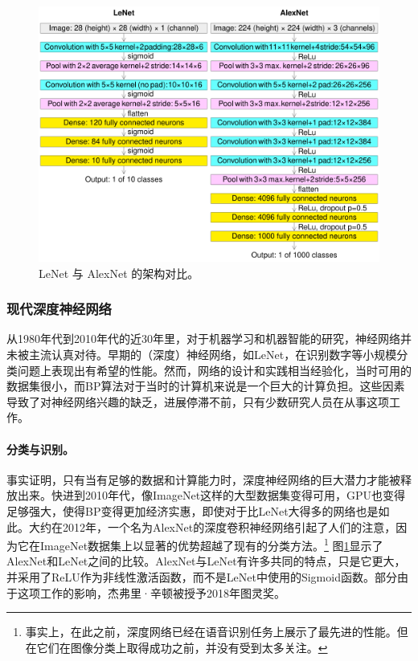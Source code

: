 \documentclass[../../book-main.tex]{subfiles}
\begin{document}
\begin{figure}
    \centering
    \includegraphics[width=0.8\linewidth]{figures/Comparison_image_neural_networks.svg.png}
    \caption{LeNet \cite{LeCun-1989} 与 AlexNet \cite{krizhevsky2012imagenet} 的架构对比。}
    \label{fig:LeNet-AlexNet}
\end{figure}


\subsubsection{现代深度神经网络}
从1980年代到2010年代的近30年里，对于机器学习和机器智能的研究，神经网络并未被主流认真对待。早期的（深度）神经网络，如LeNet，在识别数字等小规模分类问题上表现出有希望的性能。然而，网络的设计和实践相当经验化，当时可用的数据集很小，而BP算法对于当时的计算机来说是一个巨大的计算负担。这些因素导致了对神经网络兴趣的缺乏，进展停滞不前，只有少数研究人员在从事这项工作。

\paragraph{分类与识别。}
事实证明，只有当有足够的数据和计算能力时，深度神经网络的巨大潜力才能被释放出来。快进到2010年代，像ImageNet这样的大型数据集变得可用，GPU也变得足够强大，使得BP变得更加经济实惠，即使对于比LeNet大得多的网络也是如此。大约在2012年，一个名为AlexNet的深度卷积神经网络引起了人们的注意，因为它在ImageNet数据集上以显著的优势超越了现有的分类方法\cite{krizhevsky2012imagenet}。\footnote{事实上，在此之前，深度网络已经在语音识别任务上展示了最先进的性能。但在它们在图像分类上取得成功之前，并没有受到太多关注。} 图\ref{fig:LeNet-AlexNet}显示了AlexNet和LeNet之间的比较。AlexNet与LeNet有许多共同的特点，只是它更大，并采用了ReLU作为非线性激活函数，而不是LeNet中使用的Sigmoid函数。部分由于这项工作的影响，杰弗里·辛顿被授予2018年图灵奖。
\end{document}
